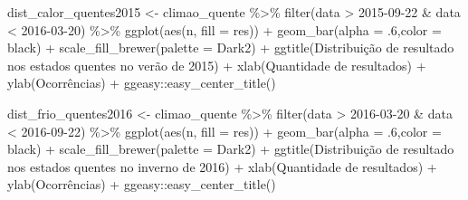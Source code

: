 \documentclass[
]{article}
\newenvironment{Shaded}{\begin{snugshade}}{\end{snugshade}}
\newcommand{\AttributeTok}[1]{\textcolor[rgb]{0.77,0.63,0.00}{#1}}
\newcommand{\DecValTok}[1]{\textcolor[rgb]{0.00,0.00,0.81}{#1}}
\newcommand{\FunctionTok}[1]{\textcolor[rgb]{0.00,0.00,0.00}{#1}}
\newcommand{\NormalTok}[1]{#1}
\newcommand{\OtherTok}[1]{\textcolor[rgb]{0.56,0.35,0.01}{#1}}
\newcommand{\SpecialCharTok}[1]{\textcolor[rgb]{0.00,0.00,0.00}{#1}}
\newcommand{\StringTok}[1]{\textcolor[rgb]{0.31,0.60,0.02}{#1}}
\begin{document}
\begin{Shaded}
\begin{Highlighting}[]
\NormalTok{dist\_calor\_quentes2015 }\OtherTok{\textless{}{-}}\NormalTok{ climao\_quente }\SpecialCharTok{\%\textgreater{}\%} 
  \FunctionTok{filter}\NormalTok{(data }\SpecialCharTok{\textgreater{}} \StringTok{\textquotesingle{}2015{-}09{-}22\textquotesingle{}} \SpecialCharTok{\&}\NormalTok{ data }\SpecialCharTok{\textless{}} \StringTok{\textquotesingle{}2016{-}03{-}20\textquotesingle{}}\NormalTok{) }\SpecialCharTok{\%\textgreater{}\%}
  \FunctionTok{ggplot}\NormalTok{(}\FunctionTok{aes}\NormalTok{(n, }\AttributeTok{fill =}\NormalTok{ res)) }\SpecialCharTok{+} 
  \FunctionTok{geom\_bar}\NormalTok{(}\AttributeTok{alpha =}\NormalTok{ .}\DecValTok{6}\NormalTok{,}\AttributeTok{color =} \StringTok{\textquotesingle{}black\textquotesingle{}}\NormalTok{) }\SpecialCharTok{+} 
  \FunctionTok{scale\_fill\_brewer}\NormalTok{(}\AttributeTok{palette =} \StringTok{\textquotesingle{}Dark2\textquotesingle{}}\NormalTok{) }\SpecialCharTok{+}
  \FunctionTok{ggtitle}\NormalTok{(}\StringTok{\textquotesingle{}Distribuição de resultado nos estados quentes no verão de 2015\textquotesingle{}}\NormalTok{) }\SpecialCharTok{+}
  \FunctionTok{xlab}\NormalTok{(}\StringTok{\textquotesingle{}Quantidade de resultados\textquotesingle{}}\NormalTok{) }\SpecialCharTok{+} \FunctionTok{ylab}\NormalTok{(}\StringTok{\textquotesingle{}Ocorrências\textquotesingle{}}\NormalTok{) }\SpecialCharTok{+}
\NormalTok{  ggeasy}\SpecialCharTok{::}\FunctionTok{easy\_center\_title}\NormalTok{()}


\NormalTok{dist\_frio\_quentes2016 }\OtherTok{\textless{}{-}}\NormalTok{ climao\_quente }\SpecialCharTok{\%\textgreater{}\%} 
  \FunctionTok{filter}\NormalTok{(data }\SpecialCharTok{\textgreater{}} \StringTok{\textquotesingle{}2016{-}03{-}20\textquotesingle{}} \SpecialCharTok{\&}\NormalTok{ data }\SpecialCharTok{\textless{}} \StringTok{\textquotesingle{}2016{-}09{-}22\textquotesingle{}}\NormalTok{) }\SpecialCharTok{\%\textgreater{}\%}
  \FunctionTok{ggplot}\NormalTok{(}\FunctionTok{aes}\NormalTok{(n, }\AttributeTok{fill =}\NormalTok{ res)) }\SpecialCharTok{+} 
  \FunctionTok{geom\_bar}\NormalTok{(}\AttributeTok{alpha =}\NormalTok{ .}\DecValTok{6}\NormalTok{,}\AttributeTok{color =} \StringTok{\textquotesingle{}black\textquotesingle{}}\NormalTok{) }\SpecialCharTok{+} 
  \FunctionTok{scale\_fill\_brewer}\NormalTok{(}\AttributeTok{palette =} \StringTok{\textquotesingle{}Dark2\textquotesingle{}}\NormalTok{) }\SpecialCharTok{+}
  \FunctionTok{ggtitle}\NormalTok{(}\StringTok{\textquotesingle{}Distribuição de resultado nos estados quentes no inverno de 2016\textquotesingle{}}\NormalTok{) }\SpecialCharTok{+}
  \FunctionTok{xlab}\NormalTok{(}\StringTok{\textquotesingle{}Quantidade de resultados\textquotesingle{}}\NormalTok{) }\SpecialCharTok{+} \FunctionTok{ylab}\NormalTok{(}\StringTok{\textquotesingle{}Ocorrências\textquotesingle{}}\NormalTok{) }\SpecialCharTok{+}
\NormalTok{  ggeasy}\SpecialCharTok{::}\FunctionTok{easy\_center\_title}\NormalTok{()}


\end{Highlighting}
\end{Shaded}
\end{document}
